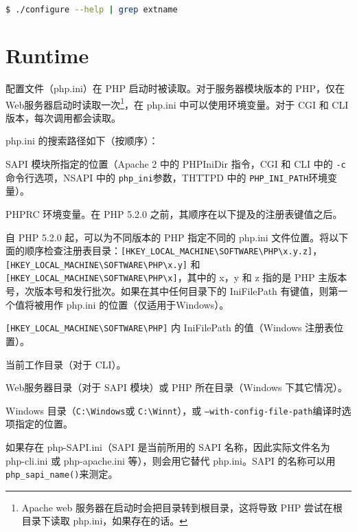 \begin{lstlisting}[language=bash]
$ ./configure --help | grep extname
\end{lstlisting}

\section{Runtime}

配置文件（php.ini）在 PHP 启动时被读取。对于服务器模块版本的 PHP，仅在Web服务器启动时读取一次\footnote{Apache web 服务器在启动时会把目录转到根目录，这将导致 PHP 尝试在根目录下读取 php.ini，如果存在的话。}，在 php.ini 中可以使用环境变量。对于 CGI 和 CLI 版本，每次调用都会读取。


php.ini 的搜索路径如下（按顺序）：

\begin{compactitem}
\item SAPI 模块所指定的位置（Apache 2 中的 PHPIniDir 指令，CGI 和 CLI 中的 \texttt{-c} 命令行选项，NSAPI 中的 \texttt{php\_ini}参数，THTTPD 中的 \texttt{PHP\_INI\_PATH}环境变量）。
\item PHPRC 环境变量。在 PHP 5.2.0 之前，其顺序在以下提及的注册表键值之后。
\item 自 PHP 5.2.0 起，可以为不同版本的 PHP 指定不同的 php.ini 文件位置。将以下面的顺序检查注册表目录：\texttt{[HKEY\_LOCAL\_MACHINE{\textbackslash}SOFTWARE{\textbackslash}PHP{\textbackslash}x.y.z]}，\texttt{[HKEY\_LOCAL\_MACHINE{\textbackslash}SOFTWARE{\textbackslash}PHP{\textbackslash}x.y]} 和 \texttt{[HKEY\_LOCAL\_MACHINE{\textbackslash}SOFTWARE{\textbackslash}PHP{\textbackslash}x]}，其中的 x，y 和 z 指的是 PHP 主版本号，次版本号和发行批次。如果在其中任何目录下的 IniFilePath 有键值，则第一个值将被用作 php.ini 的位置（仅适用于Windows）。
\item \texttt{[HKEY\_LOCAL\_MACHINE{\textbackslash}SOFTWARE{\textbackslash}PHP]} 内 IniFilePath 的值（Windows 注册表位置）。
\item 当前工作目录（对于 CLI）。
\item Web服务器目录（对于 SAPI 模块）或 PHP 所在目录（Windows 下其它情况）。
\item Windows 目录（\texttt{C:{\textbackslash}Windows}或 \texttt{C:{\textbackslash}Winnt}），或 \texttt{--with-config-file-path}编译时选项指定的位置。
\end{compactitem}

如果存在 php-SAPI.ini（SAPI 是当前所用的 SAPI 名称，因此实际文件名为 php-cli.ini 或 php-apache.ini 等），则会用它替代 php.ini。SAPI 的名称可以用 \texttt{php\_sapi\_name()}来测定。


